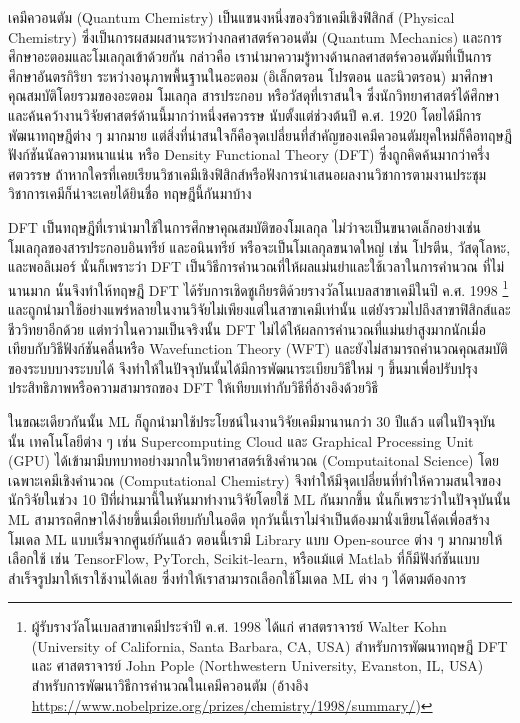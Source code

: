เคมีควอนตัม (Quantum Chemistry) เป็นแขนงหนึ่งของวิชาเคมีเชิงฟิสิกส์ (Physical Chemistry) ซึ่งเป็นการผสมผสานระหว่างกลศาสตร์ควอนตัม 
(Quantum Mechanics) และการศึกษาอะตอมและโมเลกุลเข้าด้วยกัน กล่าวคือ เรานำมาความรู้ทางด้านกลศาสตร์ควอนตัมที่เป็นการศึกษาอันตรกิริยา%
ระหว่างอนุภาพพื้นฐานในอะตอม (อิเล็กตรอน โปรตอน และนิวตรอน) มาศึกษาคุณสมบัติโดยรวมของอะตอม โมเลกุล สารประกอบ หรือวัสดุที่เราสนใจ
ซึ่งนักวิทยาศาสตร์ได้ศึกษาและค้นคว้างานวิจัยศาสตร์ด้านนี้มากว่าหนึ่งศควรรษ นับตั้งแต่ช่วงต้นปี ค.ศ. 1920 โดยได้มีการพัฒนาทฤษฎีต่าง ๆ มากมาย 
แต่สิ่งที่น่าสนใจก็คือจุดเปลี่ยนที่สำคัญของเคมีควอนตัมยุคใหม่ก็คือทฤษฎีฟังก์ชันนัลความหนาแน่น หรือ Density Functional Theory (DFT) 
ซึ่งถูกคิดค้นมากว่าครึ่งศตวรรษ ถ้าหากใครที่เคยเรียนวิชาเคมีเชิงฟิสิกส์หรือฟังการนำเสนอผลงานวิชาการตามงานประชุมวิชาการเคมีก็น่าจะเคยได้ยินชื่อ%
ทฤษฎีนี้กันมาบ้าง 

DFT เป็นทฤษฎีที่เรานำมาใช้ในการศึกษาคุณสมบัติของโมเลกุล ไม่ว่าจะเป็นขนาดเล็กอย่างเช่นโมเลกุลของสารประกอบอินทรีย์ และอนินทรีย์ 
หรือจะเป็นโมเลกุลขนาดใหญ่ เช่น โปรตีน, วัสดุโลหะ, และพอลิเมอร์ นั่นก็เพราะว่า DFT เป็นวิธีการคำนวณที่ให้ผลแม่นยำและใช้เวลาในการคำนวณ%
ที่ไม่นานมาก นั่นจึงทำให้ทฤษฎี DFT ได้รับการเชิดชูเกียรติด้วยรางวัลโนเบลสาขาเคมีในปี ค.ศ. 1998%
\footnote{ผู้รับรางวัลโนเบลสาขาเคมีประจำปี ค.ศ. 1998 ได้แก่ ศาสตราจารย์ Walter Kohn (University of California, 
Santa Barbara, CA, USA) สำหรับการพัฒนาทฤษฎี DFT และ ศาสตราจารย์ John Pople (Northwestern University, Evanston, IL, USA) 
สำหรับการพัฒนาวิธีการคำนวณในเคมีควอนตัม (อ้างอิง \url{https://www.nobelprize.org/prizes/chemistry/1998/summary/})} 
และถูกนำมาใช้อย่างแพร่หลายในงานวิจัยไม่เพียงแต่ในสาขาเคมีเท่านั้น แต่ยังรวมไปถึงสาขาฟิสิกส์และชีววิทยาอีกด้วย แต่ทว่าในความเป็นจริงนั้น DFT 
ไม่ได้ให้ผลการคำนวณที่แม่นยำสูงมากนักเมื่อเทียบกับวิธีฟังก์ชันคลื่นหรือ Wavefunction Theory (WFT) และยังไม่สามารถคำนวณคุณสมบัติของระบบบางระบบได้ 
จึงทำให้ในปัจจุบันนั้นได้มีการพัฒนาระเบียบวิธีใหม่ ๆ ขึ้นมาเพื่อปรับปรุงประสิทธิภาพหรือความสามารถของ DFT ให้เทียบเท่ากับวิธีที่อ้างอิงด้วยวิธี

ในขณะเดียวกันนั้น ML ก็ถูกนำมาใช้ประโยชน์ในงานวิจัยเคมีมานานกว่า 30 ปีแล้ว แต่ในปัจจุบันนั้น เทคโนโลยีต่าง ๆ เช่น Supercomputing Cloud และ 
Graphical Processing Unit (GPU) ได้เข้ามามีบทบาทอย่างมากในวิทยาศาสตร์เชิงคำนวณ (Computaitonal Science) โดยเฉพาะเคมีเชิงคำนวณ 
(Computational Chemistry) จึงทำให้มีจุดเปลี่ยนที่ทำให้ความสนใจของนักวิจัยในช่วง 10 ปีที่ผ่านมานี้ในหันมาทำงานวิจัยโดยใช้ ML กันมากขึ้น 
นั่นก็เพราะว่าในปัจจุบันนั้น ML สามารถศึกษาได้ง่ายขึ้นเมื่อเทียบกับในอดีต ทุกวันนี้เราไม่จำเป็นต้องมานั่งเขียนโค้ดเพื่อสร้างโมเดล ML แบบเริ่มจากศูนย์กันแล้ว 
ตอนนี้เรามี Library แบบ Open-source ต่าง ๆ มากมายให้เลือกใช้ เช่น TensorFlow, PyTorch, Scikit-learn, หรือแม้แต่ Matlab 
ที่ก็มีฟังก์ชันแบบสำเร็จรูปมาให้เราใช้งานได้เลย ซึ่งทำให้เราสามารถเลือกใช้โมเดล ML ต่าง ๆ ได้ตามต้องการ

